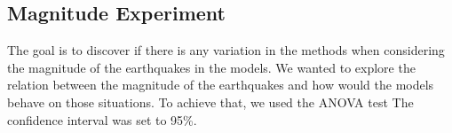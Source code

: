 %
%
%




\subsection{Magnitude Experiment}\label{magExp}
The goal is to discover if there is any variation in the methods when
considering the magnitude of the earthquakes in the models. We wanted
to explore the relation between the magnitude of the earthquakes and
how would the models behave on those situations. To achieve that, we
used the ANOVA test The confidence interval was set to 95\%.

